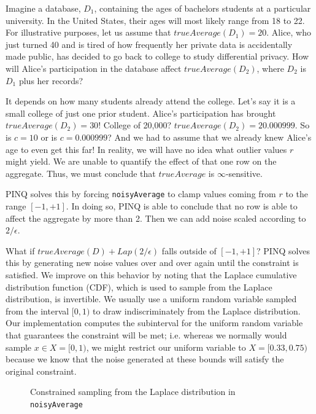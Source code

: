 \documentclass[12pt]{article}
\begin{document}
Imagine a database, $D_1$, containing the ages of bachelors students at a particular university.
In the United States, their ages will most likely range from 18 to 22.
For illustrative purposes, let us assume that $trueAverage(D_1) = 20$.
Alice, who just turned 40 and is tired of how frequently her private data is accidentally made public, has decided to go back to college to study differential privacy.
How will Alice's participation in the database affect $trueAverage(D_2)$, where $D_2$ is $D_1$ plus her records?

It depends on how many students already attend the college.
Let's say it is a small college of just one prior student.
Alice's participation has brought $trueAverage(D_2) = 30$!
College of 20,000?
$trueAverage(D_2) = 20.000999$.
So is $c=10$ or is $c=0.000999$?
And we had to assume that we already knew Alice's age to even get this far!
In reality, we will have no idea what outlier values $r$ might yield.
We are unable to quantify the effect of that one row on the aggregate.
Thus, we must conclude that $trueAverage$ is $\infty$-sensitive.

PINQ solves this by forcing \texttt{noisyAverage} to clamp values coming from $r$ to the range $[-1,+1]$.
In doing so, PINQ is able to conclude that no row is able to affect the aggregate by more than 2.
Then we can add noise scaled according to $2/\epsilon$.

What if $trueAverage(D) + Lap(2/\epsilon)$ falls outside of $[-1,+1]$?
PINQ solves this by generating new noise values over and over again until the constraint is satisfied.
We improve on this behavior by noting that the Laplace cumulative distribution function (CDF), which is used to sample from the Laplace distribution, is invertible.
We usually use a uniform random variable sampled from the interval $[0,1)$ to draw indiscriminately from the Laplace distribution.
Our implementation computes the subinterval for the uniform random variable that guarantees the constraint will be met; i.e. whereas we normally would sample $x \in X=[0,1)$, we might restrict our uniform variable to $X=[0.33,0.75)$ because we know that the noise generated at these bounds will satisfy the original constraint.

\begin{figure}
    \centering
    \def\svgwidth{\columnwidth}
    
    \caption{Constrained sampling from the Laplace distribution in \lstinline{noisyAverage}}
\end{figure}
\end{document}

